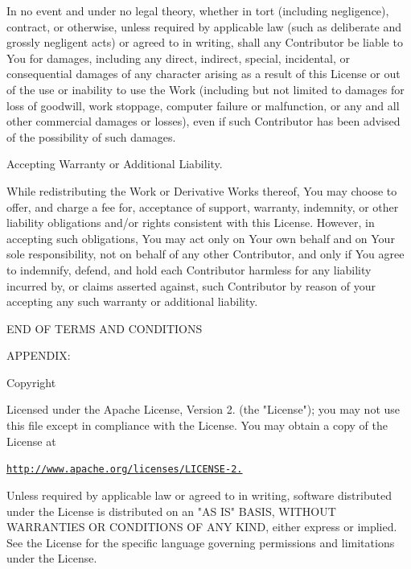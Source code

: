 In no event and under no legal theory, whether in tort (including negligence), contract, or otherwise, unless required by applicable law (such as deliberate and grossly negligent acts) or agreed to in writing, shall any Contributor be liable to You for damages, including any direct, indirect, special, incidental, or consequential damages of any character arising as a result of this License or out of the use or inability to use the Work (including but not limited to damages for loss of goodwill, work stoppage, computer failure or malfunction, or any and all other commercial damages or losses), even if such Contributor has been advised of the possibility of such damages.


\begin{DoxyEnumerate}
\item Accepting Warranty or Additional Liability.
\end{DoxyEnumerate}

While redistributing the Work or Derivative Works thereof, You may choose to offer, and charge a fee for, acceptance of support, warranty, indemnity, or other liability obligations and/\+or rights consistent with this License. However, in accepting such obligations, You may act only on Your own behalf and on Your sole responsibility, not on behalf of any other Contributor, and only if You agree to indemnify, defend, and hold each Contributor harmless for any liability incurred by, or claims asserted against, such Contributor by reason of your accepting any such warranty or additional liability.

END OF TERMS AND CONDITIONS

APPENDIX:\+

Copyright \+[2019]\+ \+[STMicroelectronics]\+

Licensed under the Apache License, Version 2. (the "{}\+License"{}); you may not use this file except in compliance with the License. You may obtain a copy of the License at

\href{http://www.apache.org/licenses/LICENSE-2.0}{\texttt{http:\+/\+/\+www.\+apache.\+org/\+licenses/\+\+LICENSE-\/2.}}

Unless required by applicable law or agreed to in writing, software distributed under the License is distributed on an "{}\+AS IS"{} BASIS, WITHOUT WARRANTIES OR CONDITIONS OF ANY KIND, either express or implied. See the License for the specific language governing permissions and limitations under the License. 